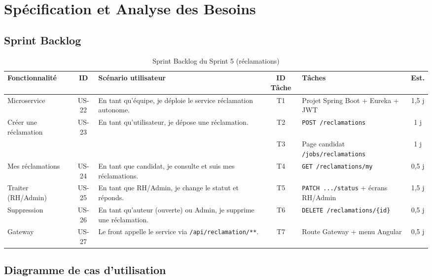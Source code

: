 \section{Spécification et Analyse des Besoins}

\subsection{Sprint Backlog}

\begin{table}[htbp]
  \centering
  \scriptsize
  \caption{Sprint Backlog du Sprint 5 (réclamations)}
  \label{tab:sprint5-backlog}
  \begin{tabular}{|p{2.1cm}|c|p{4.0cm}|c|p{3.1cm}|c|}
    \hline
    \textbf{Fonctionnalité} & \textbf{ID} & \textbf{Scénario utilisateur} &
    \textbf{ID Tâche} & \textbf{Tâches} & \textbf{Est.} \\
    \hline
    Microservice
    & US-22
    & En tant qu'équipe, je déploie le service réclamation autonome.
    & T1
    & Projet Spring Boot + Eureka + JWT
    & 1,5 j \\
    \hline
    Créer une réclamation
    & US-23
    & En tant qu'utilisateur, je dépose une réclamation.
    & T2
    & \texttt{POST /reclamations}
    & 1 j \\
    \cline{4-6}
    & & & T3 & Page candidat \texttt{/jobs/reclamations} & 1 j \\
    \hline
    Mes réclamations
    & US-24
    & En tant que candidat, je consulte et suis mes réclamations.
    & T4
    & \texttt{GET /reclamations/my}
    & 0,5 j \\
    \hline
    Traiter (RH/Admin)
    & US-25
    & En tant que RH/Admin, je change le statut et réponds.
    & T5
    & \texttt{PATCH .../status} + écrans RH/Admin
    & 1,5 j \\
    \hline
    Suppression
    & US-26
    & En tant qu'auteur (ouverte) ou Admin, je supprime une réclamation.
    & T6
    & \texttt{DELETE /reclamations/\{id\}}
    & 0,5 j \\
    \hline
    Gateway
    & US-27
    & Le front appelle le service via \texttt{/api/reclamation/**}.
    & T7
    & Route Gateway + menu Angular
    & 0,5 j \\
    \hline
  \end{tabular}
\end{table}


\subsection{Diagramme de cas d'utilisation}

